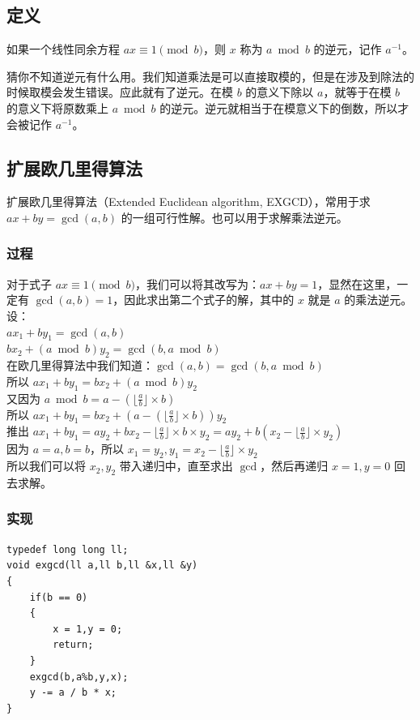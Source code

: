 \documentclass[11pt,oneside,a4paper,UTF8]{book}
\begin{document}
	\subsection{定义}
	如果一个线性同余方程 $ax \equiv 1 \pmod b$，则 $x$ 称为 $a \bmod b$ 的逆元，记作 $a^{-1}$。\par
	猜你不知道逆元有什么用。我们知道乘法是可以直接取模的，但是在涉及到除法的时候取模会发生错误。应此就有了逆元。在模 $b$ 的意义下除以 $a$，就等于在模 $b$ 的意义下将原数乘上 $a\bmod b$ 的逆元。逆元就相当于在模意义下的倒数，所以才会被记作 $a^{-1}$。
	\subsection{扩展欧几里得算法}
	扩展欧几里得算法（Extended Euclidean algorithm, EXGCD），常用于求 $ax+by=\gcd(a,b)$ 的一组可行性解。也可以用于求解乘法逆元。
	\subsubsection{过程}
	\noindent
	对于式子 $ax \equiv 1 \pmod b$，我们可以将其改写为：$ax + by = 1$，显然在这里，一定有 $\gcd(a,b) = 1$，因此求出第二个式子的解，其中的 $x$ 就是 $a$ 的乘法逆元。\\
	设：\\
	$ax_1 + by_1 = \gcd(a,b)$\\
	$bx_2 + (a \bmod b)y_2 = \gcd(b,a \bmod b)$\\
	在欧几里得算法中我们知道：$\gcd(a,b) = \gcd(b,a\bmod b)$\\
	所以 $ax_1 + by_1 = bx_2 + (a \bmod b)y_2$\\
	又因为 $a \bmod b = a - (\lfloor\frac{a}{b}\rfloor\times b)$\\
	所以 $ax_1+by_1=bx_2+(a-(\lfloor\frac{a}{b}\rfloor\times b))y_2$\\
	推出 $ax_1+by_1=ay_2+bx_2-\lfloor\frac{a}{b}\rfloor\times b\times y_2=ay_2+b(x_2-\lfloor\frac{a}{b}\rfloor\times y_2)$\\
	因为 $a = a,b = b$，所以 $x_1=y_2,y_1=x_2-\lfloor\frac{a}{b}\rfloor\times y_2$\\
	所以我们可以将 $x_2,y_2$ 带入递归中，直至求出 $\gcd$，然后再递归 $x=1,y=0$ 回去求解。\\
	\subsubsection{实现}
	\begin{lstlisting}
typedef long long ll;
void exgcd(ll a,ll b,ll &x,ll &y)
{ 
	if(b == 0)
	{
		x = 1,y = 0;
		return;
	}
	exgcd(b,a%b,y,x);
	y -= a / b * x;
}
	\end{lstlisting}
	
\end{document}
